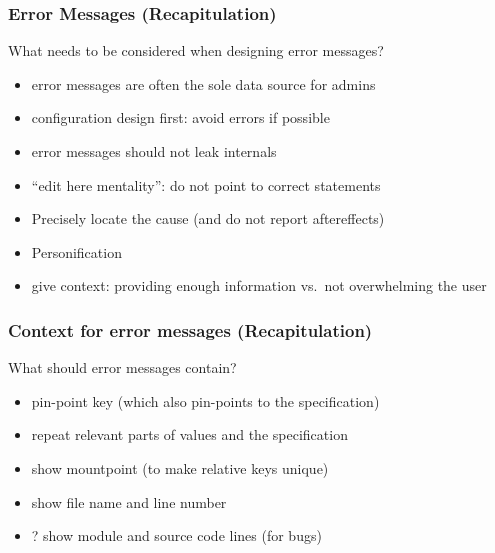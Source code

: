 \begin{frame}
	\frametitle{Error Messages (Recapitulation)}

	\begin{task}
	What needs to be considered when designing error messages?
	\end{task}

	\pause

	\begin{itemize} %
	\item error messages are often the sole data source for admins
	\item configuration design first: avoid errors if possible
	\item error messages should not leak internals~\cite{brown1983error}
	\item ``edit here mentality'': do not point to correct statements~\cite{marceau2011mind}
	\item Precisely locate the cause (and do not report aftereffects)
	\item Personification~\cite{lee2011personifying}
	\item give context: providing enough information vs.\ not overwhelming the user~\cite{wrenn2017error}
	\end{itemize}
\end{frame}

\begin{frame}
	\frametitle{Context for error messages (Recapitulation)}

	\begin{task}
	What should error messages contain?
	\end{task}

	\pause

	\begin{itemize} %
	\item pin-point key (which also pin-points to the specification)
	\item repeat relevant parts of values and the specification
	\item show mountpoint (to make relative keys unique)
	\item show file name and line number
	\item ? show module and source code lines (for bugs)
	\end{itemize}
\end{frame}




\nocite{raab2017introducing}

\appendix

\begin{frame}[allowframebreaks]
	
	
\end{frame}




